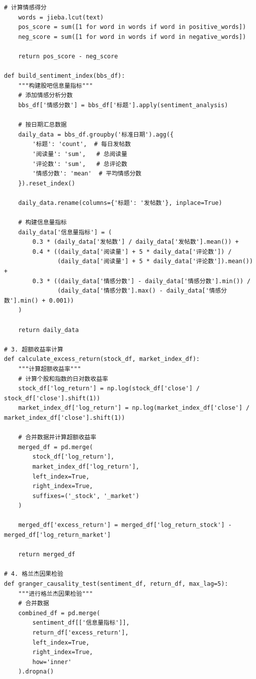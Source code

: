 \documentclass[12pt, a4paper]{article}
\begin{document}
\begin{lstlisting}[basicstyle=\small\ttfamily, breaklines=true, columns=fullflexible]
    # 计算情感得分
    words = jieba.lcut(text)
    pos_score = sum([1 for word in words if word in positive_words])
    neg_score = sum([1 for word in words if word in negative_words])
    
    return pos_score - neg_score

def build_sentiment_index(bbs_df):
    """构建股吧信息量指标"""
    # 添加情感分析分数
    bbs_df['情感分数'] = bbs_df['标题'].apply(sentiment_analysis)
    
    # 按日期汇总数据
    daily_data = bbs_df.groupby('标准日期').agg({
        '标题': 'count',  # 每日发帖数
        '阅读量': 'sum',   # 总阅读量
        '评论数': 'sum',   # 总评论数
        '情感分数': 'mean'  # 平均情感分数
    }).reset_index()
    
    daily_data.rename(columns={'标题': '发帖数'}, inplace=True)
    
    # 构建信息量指标
    daily_data['信息量指标'] = (
        0.3 * (daily_data['发帖数'] / daily_data['发帖数'].mean()) + 
        0.4 * ((daily_data['阅读量'] + 5 * daily_data['评论数']) / 
               (daily_data['阅读量'] + 5 * daily_data['评论数']).mean()) +
        0.3 * ((daily_data['情感分数'] - daily_data['情感分数'].min()) / 
               (daily_data['情感分数'].max() - daily_data['情感分数'].min() + 0.001))
    )
    
    return daily_data

# 3. 超额收益率计算
def calculate_excess_return(stock_df, market_index_df):
    """计算超额收益率"""
    # 计算个股和指数的日对数收益率
    stock_df['log_return'] = np.log(stock_df['close'] / stock_df['close'].shift(1))
    market_index_df['log_return'] = np.log(market_index_df['close'] / market_index_df['close'].shift(1))
    
    # 合并数据并计算超额收益率
    merged_df = pd.merge(
        stock_df['log_return'], 
        market_index_df['log_return'], 
        left_index=True, 
        right_index=True,
        suffixes=('_stock', '_market')
    )
    
    merged_df['excess_return'] = merged_df['log_return_stock'] - merged_df['log_return_market']
    
    return merged_df

# 4. 格兰杰因果检验
def granger_causality_test(sentiment_df, return_df, max_lag=5):
    """进行格兰杰因果检验"""
    # 合并数据
    combined_df = pd.merge(
        sentiment_df[['信息量指标']],
        return_df['excess_return'],
        left_index=True,
        right_index=True,
        how='inner'
    ).dropna()
    

\end{lstlisting}
\end{document}

